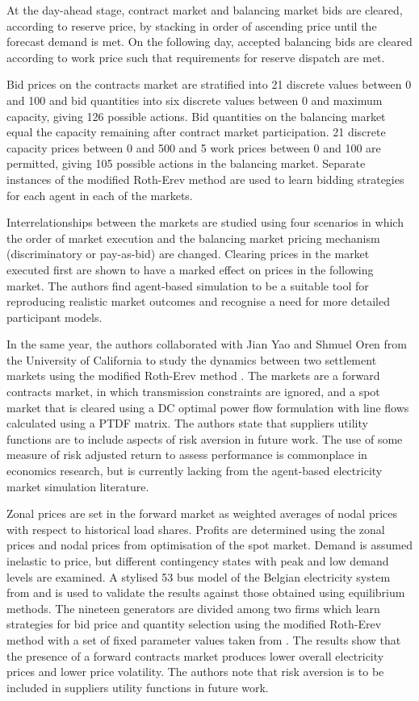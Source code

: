 At the day-ahead stage, contract market and balancing market bids are cleared,
according to reserve price, by stacking in order of ascending price until the
forecast demand is met.  On the following day, accepted balancing bids are
cleared according to work price such that requirements for reserve dispatch
are met.

Bid prices on the contracts market are stratified into 21 discrete
values between 0 and 100 and bid quantities into six discrete values between 0
and maximum capacity, giving 126 possible actions.  Bid quantities on the
balancing market equal the capacity remaining after contract market
participation.  21 discrete capacity prices between 0 and 500 and 5 work prices
between 0 and 100 are permitted, giving 105 possible actions in the balancing
market.  Separate instances of the modified Roth-Erev method are used to learn
bidding strategies for each agent in each of the markets.

Interrelationships between the markets are studied using four scenarios in
which the order of market execution and the balancing market pricing mechanism
(discriminatory or pay-as-bid) are changed.  Clearing prices in the market
executed first are shown to have a marked effect on prices in the
following market.  The authors find agent-based simulation to be a suitable
tool for reproducing realistic market outcomes and recognise a need for more
detailed participant models.

In the same year, the authors collaborated with Jian Yao and Shmuel Oren from
the University of California to study the dynamics between two settlement
markets using the modified Roth-Erev method \cite{viet:06}.  The markets are a
forward contracts market, in which transmission constraints are ignored, and a spot
market that is cleared using a DC optimal power flow formulation with line
flows calculated using a PTDF matrix.  The authors state that suppliers utility
functions are to include aspects of risk aversion in future work.  The use of
some measure of risk adjusted return to assess performance is commonplace in
economics research, but is currently lacking from the agent-based electricity
market simulation literature.

Zonal prices are set in the forward market as weighted averages of nodal prices
with respect to historical load shares.  Profits are determined using the
zonal prices and nodal prices from optimisation of the spot market.  Demand is assumed
inelastic to price, but different contingency states with peak and low demand
levels are examined.  A stylised 53 bus model of the Belgian electricity
system from  and  is used to validate the results
against those obtained using equilibrium methods.  The nineteen generators are divided among
two firms which learn strategies for bid price and quantity selection using the
modified Roth-Erev method with a set of fixed parameter values taken from
.  The results show that the presence of a forward contracts
market produces lower overall electricity prices and lower price volatility.
The authors note that risk aversion is to be included in suppliers utility
functions in future work.

